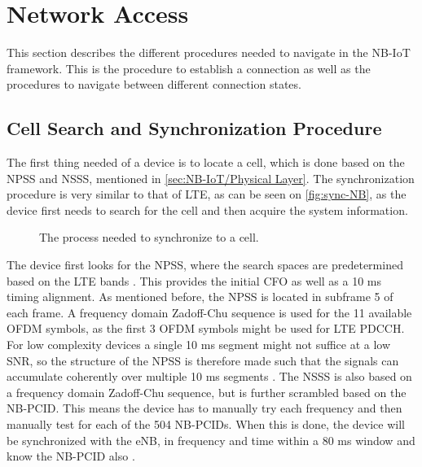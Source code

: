 




\section{Network Access}
\label{sec:Network_access}
This section describes the different procedures needed to navigate in the NB-IoT framework. This is the procedure to establish a connection as well as the procedures to navigate between different connection states. 

\subsection{Cell Search and Synchronization Procedure}
\label{sec:cellsync}
The first thing needed of a device is to locate a cell, which is done based on the NPSS and NSSS, mentioned in \autoref{sec:NB-IoT/Physical Layer}. The synchronization procedure is very similar to that of \gls{LTE}, as can be seen on \autoref{fig:sync-NB}, as the device first needs to search for the cell and then acquire the system information. 


\begin{figure}[H]
\centering

\caption{The process needed to synchronize to a cell.}
\label{fig:sync-NB}
\end{figure}

The device first looks for the \gls{NPSS}, where the search spaces are predetermined based on the LTE bands \citep{whitepaper}. This provides the initial \gls{CFO} as well as a 10 ms timing alignment. As mentioned before, the NPSS is located in subframe 5 of each frame. A frequency domain Zadoff-Chu sequence is used for the 11 available \gls{OFDM} symbols, as the first 3 OFDM symbols might be used for LTE PDCCH. For low complexity devices a single 10 ms segment might not suffice at a low \gls{SNR}, so the structure of the \gls{NPSS} is therefore made such that the signals can accumulate coherently over multiple 10 ms segments \citep{NB-IoT_Book,primer}. The \gls{NSSS} is also based on a frequency domain Zadoff-Chu sequence, but is further scrambled based on the \gls{NB-PCID}. This means the device has to manually try each frequency and then manually test for each of the 504 NB-PCIDs. When this is done, the device will be synchronized with the eNB, in frequency and time within a 80 ms window and know the NB-PCID also \citep{NB-IoT_Book,primer}. 

